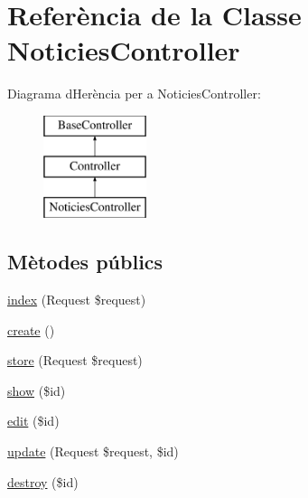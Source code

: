\hypertarget{class_app_1_1_http_1_1_controllers_1_1_noticies_controller}{}\section{Referència de la Classe Noticies\+Controller}
\label{class_app_1_1_http_1_1_controllers_1_1_noticies_controller}
Diagrama d\textquotesingle{}Herència per a Noticies\+Controller\+:\begin{figure}[H]
\begin{center}
\leavevmode
\includegraphics[height=3.000000cm]{class_app_1_1_http_1_1_controllers_1_1_noticies_controller}
\end{center}
\end{figure}
\subsection*{Mètodes públics}
\begin{DoxyCompactItemize}
\item 
\mbox{\hyperlink{class_app_1_1_http_1_1_controllers_1_1_noticies_controller_ab567a949f50e20ea3d95ad062a17e3c3}{index}} (Request \$request)
\item 
\mbox{\hyperlink{class_app_1_1_http_1_1_controllers_1_1_noticies_controller_a435e7d7525d4bcd0ed5e34a469f3adf6}{create}} ()
\item 
\mbox{\hyperlink{class_app_1_1_http_1_1_controllers_1_1_noticies_controller_a9ef485163104597c12185b53cdacf638}{store}} (Request \$request)
\item 
\mbox{\hyperlink{class_app_1_1_http_1_1_controllers_1_1_noticies_controller_ae4914d07a9bbe4aede7a5dea759f6287}{show}} (\$id)
\item 
\mbox{\hyperlink{class_app_1_1_http_1_1_controllers_1_1_noticies_controller_a459ed16587e3a50b39b672c7e473abc5}{edit}} (\$id)
\item 
\mbox{\hyperlink{class_app_1_1_http_1_1_controllers_1_1_noticies_controller_affb03cc19897a1800a0f411264d6c7cc}{update}} (Request \$request, \$id)
\item 
\mbox{\hyperlink{class_app_1_1_http_1_1_controllers_1_1_noticies_controller_a726fa8a4b4b187b9ca32ba427aac8137}{destroy}} (\$id)
\end{DoxyCompactItemize}


